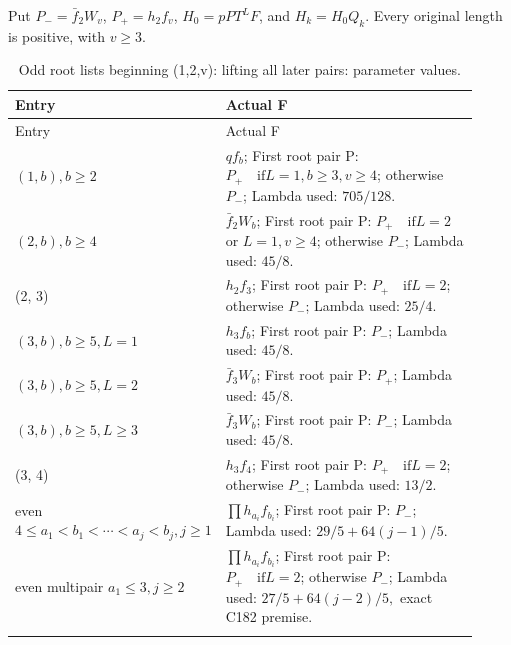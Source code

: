 Put \(P_-=\bar f_2W_v\), \(P_+=h_2f_v\), \(H_0=pPT^LF\), and \(H_k=H_0Q_k\). Every original length is positive, with \(v\ge3\).


\begingroup\small
\setlength{\tabcolsep}{3pt}
\setlength{\LTleft}{0pt}\setlength{\LTright}{\fill}
\begin{longtable}{@{}p{0.2200\linewidth}p{0.7000\linewidth}@{}}
\caption{Odd root lists beginning (1,2,v): lifting all later pairs: parameter values.}\label{tab:parameters:q5-c185:3}\\
\toprule
Entry & Actual F \\
\midrule\endfirsthead
\toprule
Entry & Actual F \\
\midrule\endhead
\bottomrule\endfoot
\((1,\allowbreak b),\allowbreak b\ge 2\) & \(qf_b\); First root pair P: \(P_+ \quad\text{if} L=1,\allowbreak  b\ge 3,\allowbreak  v\ge 4\); otherwise \(P_-\); Lambda used: \(705/128\). \\
\addlinespace[2pt]
\((2,\allowbreak b),\allowbreak b\ge 4\) & \(\bar f_2 W_b\); First root pair P: \(P_+ \quad\text{if} L=2\) or \(L=1,\allowbreak  v\ge 4\); otherwise \(P_-\); Lambda used: \(45/8\). \\
\addlinespace[2pt]
(2, 3) & \(h_2 f_3\); First root pair P: \(P_+ \quad\text{if} L=2\); otherwise \(P_-\); Lambda used: \(25/4\). \\
\addlinespace[2pt]
\((3,\allowbreak b),\allowbreak b\ge 5,\allowbreak L=1\) & \(h_3 f_b\); First root pair P: \(P_-\); Lambda used: \(45/8\). \\
\addlinespace[2pt]
\((3,\allowbreak b),\allowbreak b\ge 5,\allowbreak L=2\) & \(\bar f_3 W_b\); First root pair P: \(P_+\); Lambda used: \(45/8\). \\
\addlinespace[2pt]
\((3,\allowbreak b),\allowbreak b\ge 5,\allowbreak L\ge 3\) & \(\bar f_3 W_b\); First root pair P: \(P_-\); Lambda used: \(45/8\). \\
\addlinespace[2pt]
(3, 4) & \(h_3 f_4\); First root pair P: \(P_+ \quad\text{if} L=2\); otherwise \(P_-\); Lambda used: \(13/2\). \\
\addlinespace[2pt]
even \(4\le a_1<b_1<\cdots<a_j<b_j,\allowbreak  j\ge 1\) & \(\prod h_{a_i}f_{b_i}\); First root pair P: \(P_-\); Lambda used: \(29/5+64(j-1)/5\). \\
\addlinespace[2pt]
even multipair \(a_1\le 3,\allowbreak  j\ge 2\) & \(\prod h_{a_i}f_{b_i}\); First root pair P: \(P_+ \quad\text{if} L=2\); otherwise \(P_-\); Lambda used: \(27/5+64(j-2)/5,\allowbreak \) exact C182 premise. \\
\addlinespace[2pt]

\end{longtable}
